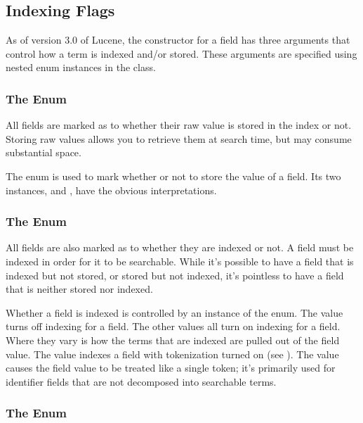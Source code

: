 \subsection{Indexing Flags}

As of version 3.0 of Lucene, the constructor for a field has three
arguments that control how a term is indexed and/or stored.  These
arguments are specified using nested enum instances in the
 class.

\subsubsection{The  Enum}

All fields are marked as to whether their raw value is stored in the
index or not.  Storing raw values allows you to retrieve them at
search time, but may consume substantial space.  

The enum  is used to mark whether or not to store
the value of a field.  Its two instances,  and
, have the obvious interpretations.

\subsubsection{The  Enum}

All fields are also marked as to whether they are indexed or not.  A
field must be indexed in order for it to be searchable.  While it's
possible to have a field that is indexed but not stored, or stored but
not indexed, it's pointless to have a field that is neither stored nor
indexed.

Whether a field is indexed is controlled by an instance of the
 enum.  The value  turns off indexing
for a field.  The other values all turn on indexing for a field.
Where they vary is how the terms that are indexed are pulled out of
the field value.  The value  indexes a field with
tokenization turned on (see ).  The value
 causes the field value to be treated like a
single token; it's primarily used for identifier fields that are not
decomposed into searchable terms.

\subsubsection{The  Enum}

